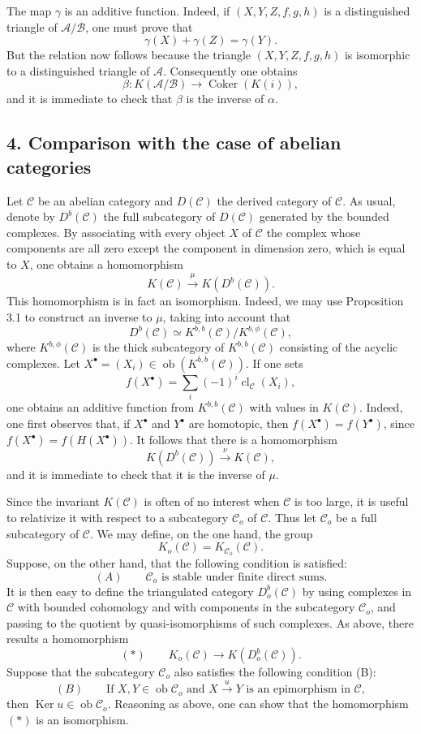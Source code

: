 \documentclass[11pt]{article}
\providecommand{\Ob}{\operatorname{ob}}
\providecommand{\cC}{\mathcal C}
\providecommand{\Ob}{\operatorname{ob}}
\providecommand{\cC}{\mathcal C}
\providecommand{\cA}{\mathcal A}
\providecommand{\cB}{\mathcal B}
\providecommand{\Ob}{\operatorname{Ob}}
\begin{document}
The map $\gamma$ is an additive function. Indeed, if $(X,Y,Z,f,g,h)$ is a distinguished triangle of $\cA/\cB$, one must prove that
\[
\gamma(X)+\gamma(Z)=\gamma(Y).
\]
But the relation now follows because the triangle $(X,Y,Z,f,g,h)$ is isomorphic to a distinguished triangle of $\cA$. Consequently one obtains
\[
\beta:K(\cA/\cB)\longrightarrow \operatorname{Coker}(K(i)),
\]
and it is immediate to check that $\beta$ is the inverse of $\alpha$.

\subsection*{4. Comparison with the case of abelian categories}

Let $\cC$ be an abelian category and $D(\cC)$ the derived category of $\cC$. As usual, denote by $D^b(\cC)$ the full subcategory of $D(\cC)$ generated by the bounded complexes. By associating with every object $X$ of $\cC$ the complex whose components are all zero except the component in dimension zero, which is equal to $X$, one obtains a homomorphism
\[
K(\cC)\xrightarrow{\mu}K(D^b(\cC)).
\]
This homomorphism is in fact an isomorphism. Indeed, we may use Proposition 3.1 to construct an inverse to $\mu$, taking into account that
\[
D^b(\cC)\simeq K^{b,b}(\cC)/K^{b,\phi}(\cC),
\]
where $K^{b,\phi}(\cC)$ is the thick subcategory of $K^{b,b}(\cC)$ consisting of the acyclic complexes. Let $X^\bullet=(X_i)\in\Ob(K^{b,b}(\cC))$. If one sets
\[
f(X^\bullet)=\sum_i(-1)^i\operatorname{cl}_{\cC}(X_i),
\]
one obtains an additive function from $K^{b,b}(\cC)$ with values in $K(\cC)$. Indeed, one first observes that, if $X^\bullet$ and $Y^\bullet$ are homotopic, then $f(X^\bullet)=f(Y^\bullet)$, since $f(X^\bullet)=f(H(X^\bullet))$. It follows that there is a homomorphism
\[
K(D^b(\cC))\xrightarrow{\nu}K(\cC),
\]
and it is immediate to check that it is the inverse of $\mu$.

Since the invariant $K(\cC)$ is often of no interest when $\cC$ is too large, it is useful to relativize it with respect to a subcategory $\cC_o$ of $\cC$. Thus let $\cC_o$ be a full subcategory of $\cC$. We may define, on the one hand, the group
\[
K_o(\cC)=K_{\cC_o}(\cC).
\]
Suppose, on the other hand, that the following condition is satisfied:
\[
(A)\qquad \cC_o\text{ is stable under finite direct sums.}
\]
It is then easy to define the triangulated category $D_o^b(\cC)$ by using complexes in $\cC$ with bounded cohomology and with components in the subcategory $\cC_o$, and passing to the quotient by quasi-isomorphisms of such complexes. As above, there results a homomorphism
\[
(*)\qquad K_o(\cC)\longrightarrow K(D_o^b(\cC)).
\]
Suppose that the subcategory $\cC_o$ also satisfies the following condition (B):
\[
(B)\qquad
\text{If }X,Y\in\Ob\cC_o\text{ and }X\xrightarrow{u}Y
\text{ is an epimorphism in }\cC,
\]
then $\operatorname{Ker}u\in\Ob\cC_o$. Reasoning as above, one can show that the homomorphism $(*)$ is an isomorphism.
\end{document}
